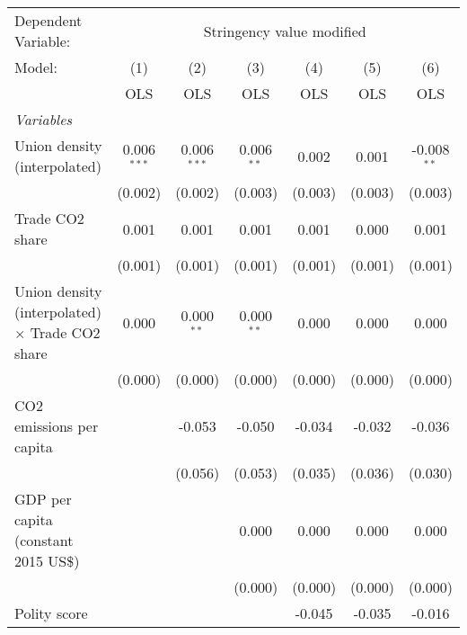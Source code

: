 
\begingroup
\centering
\begin{tabular}{lcccccc}
   \toprule
   Dependent Variable: & \multicolumn{6}{c}{Stringency value modified}\\
   Model:                                                 & (1)           & (2)           & (3)          & (4)     & (5)     & (6)\\  
                                                          &  OLS          & OLS           & OLS          & OLS     & OLS     & OLS\\  
   \midrule
   \emph{Variables}\\
   Union density (interpolated)                           & 0.006$^{***}$ & 0.006$^{***}$ & 0.006$^{**}$ & 0.002   & 0.001   & -0.008$^{**}$\\   
                                                          & (0.002)       & (0.002)       & (0.003)      & (0.003) & (0.003) & (0.003)\\   
   Trade CO2 share                                        & 0.001         & 0.001         & 0.001        & 0.001   & 0.000   & 0.001\\   
                                                          & (0.001)       & (0.001)       & (0.001)      & (0.001) & (0.001) & (0.001)\\   
   Union density (interpolated) $\times$ Trade CO2 share  & 0.000         & 0.000$^{**}$  & 0.000$^{**}$ & 0.000   & 0.000   & 0.000\\   
                                                          & (0.000)       & (0.000)       & (0.000)      & (0.000) & (0.000) & (0.000)\\   
   CO2 emissions per capita                               &               & -0.053        & -0.050       & -0.034  & -0.032  & -0.036\\   
                                                          &               & (0.056)       & (0.053)      & (0.035) & (0.036) & (0.030)\\   
   GDP per capita (constant 2015 US\$)                    &               &               & 0.000        & 0.000   & 0.000   & 0.000\\   
                                                          &               &               & (0.000)      & (0.000) & (0.000) & (0.000)\\   
   Polity score                                           &               &               &              & -0.045  & -0.035  & -0.016\\   

\end{tabular}
